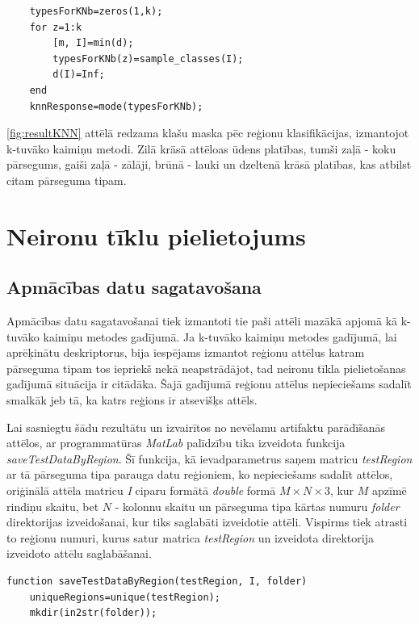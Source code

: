 \documentclass[12pt,paper=a4]{report}
\begin{document}
\begin{lstlisting}
    typesForKNb=zeros(1,k);
    for z=1:k
        [m, I]=min(d);
        typesForKNb(z)=sample_classes(I);
        d(I)=Inf;
    end
    knnResponse=mode(typesForKNb);
\end{lstlisting}\par
\ref{fig:resultKNN} attēlā redzama klašu maska pēc reģionu klasifikācijas, izmantojot k-tuvāko kaimiņu metodi. Zilā krāsā attēloas ūdens platības, tumši zaļā - koku pārsegums, gaiši zaļā - zālāji, brūnā - lauki un dzeltenā krāsā platības, kas atbilst citam pārseguma tipam.
\section{Neironu tīklu pielietojums}
\subsection{Apmācības datu sagatavošana} \label{ssec:apmDati}
Apmācības datu sagatavošanai tiek izmantoti tie paši attēli mazākā apjomā kā k-tuvāko kaimiņu metodes gadījumā. Ja k-tuvāko kaimiņu metodes gadījumā, lai aprēķinātu deskriptorus, bija iespējams izmantot reģionu attēlus katram pārseguma tipam tos iepriekš nekā neapstrādājot, tad neironu tīkla pielietošanas gadījumā situācija ir citādāka. Šajā gadījumā reģionu attēlus nepieciešams sadalīt smalkāk jeb tā, ka katrs reģions ir atsevišķs attēls. \par
Lai sasniegtu šādu rezultātu un izvairītos no nevēlamu artifaktu parādīšanās attēlos, ar programmatūras \textit{MatLab} palīdzību tika izveidota funkcija \textit{saveTestDataByRegion}. Šī funkcija, kā ievadparametrus saņem matricu \textit{testRegion} ar tā pārseguma tipa parauga datu reģioniem, ko nepieciešams sadalīt attēlos, oriģinālā attēla matricu \textit{I} ciparu formātā \textit{double} formā $ M \times N \times 3 $, kur $ M $ apzīmē rindiņu skaitu, bet $ N $ - kolonnu skaitu un pārseguma tipa kārtas numuru \textit{folder} direktorijas izveidošanai, kur tiks saglabāti izveidotie attēli. Vispirms tiek atrasti to reģionu numuri, kurus satur matrica \textit{testRegion} un izveidota direktorija izveidoto attēlu saglabāšanai.
\begin{lstlisting}
function saveTestDataByRegion(testRegion, I, folder)
	uniqueRegions=unique(testRegion);
	mkdir(in2str(folder));
\end{lstlisting}\par
\end{document}
